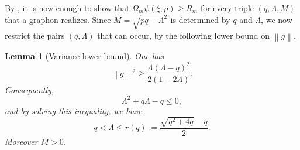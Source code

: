 ﻿\documentclass[11pt]{article}
\newtheorem{lemma}[theorem]{Lemma}
\numberwithin{equation}{section}
\newcommand{\norm}[1]{\left\lVert #1\right\rVert}
\begin{document}
By , it is now enough to show that $\Omega_m\psi(\xi,\rho)\ge R_m$ for every triple $(q,\Lambda,M)$ that a graphon realizes.
Since $M=\sqrt{pq-\Lambda^2}$ is determined by $q$ and $\Lambda$, we now restrict the pairs $(q,\Lambda)$ that can occur, by the following lower bound on $\norm g$.

\begin{lemma}[Variance lower bound]\label{lem:plt23-forced-variance}
  One has
  \begin{equation}\label{eq:plt23-forced-variance}
    \norm g^2\ge
    \frac{\Lambda(\Lambda-q)^2}{2(1-2\Lambda)}.
  \end{equation}
  Consequently,
  \begin{equation}\label{eq:plt23-alpha-ceiling-poly}
    \Lambda^2+q\Lambda-q\le0,
  \end{equation}
  and by solving this inequality, we have
  \begin{equation}\label{eq:plt23-alpha-ceiling}
    q<\Lambda\le r(q):=
    \frac{\sqrt{q^2+4q}-q}{2}.
  \end{equation}
  Moreover $M>0$.
\end{lemma}
\end{document}
